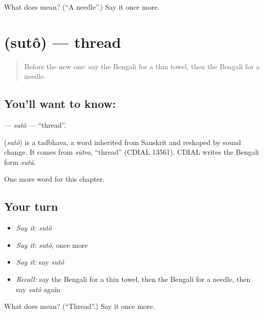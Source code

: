 \begin{tcolorbox}[breakable,colback=teal!4,colframe=teal!35!black,title={Before you move on}]
What does  mean? (\textquotedblleft{}A needle\textquotedblright{}.) Say it once more.
\end{tcolorbox}
\section[\texorpdfstring{\bn{সুতো} (sutô)}{সুতো (sutô)}]{ (sutô) — thread}

\label{lesson:BN-C109-suto}



\begin{quote}
Before the new one: say the Bengali for a thin towel, then the Bengali for a needle.
\end{quote}

\subsection*{You'll want to know: }
\textbf{} — \emph{sutô} — \textquotedblleft{}thread\textquotedblright{}.

\begin{cousinweb}
\textbf{} (\emph{sutô}) is a tadbhava, a word inherited from Sanskrit and reshaped by sound change. It comes from \emph{sūtra}, \textquotedblleft{}thread\textquotedblright{} (CDIAL 13561). CDIAL writes the Bengali form \emph{sutā}.
\end{cousinweb}

\begin{grammarlens}[title={What you've built}]
One more word for this chapter.
\end{grammarlens}

\subsection*{Your turn}
\begin{itemize}
\raggedright
  \item \emph{Say it:} \emph{sutô}
  \item \emph{Say it:} \emph{sutô}, once more
  \item \emph{Say it:} say \emph{sutô}
  \item \emph{Recall:} say the Bengali for a thin towel, then the Bengali for a needle, then say \emph{sutô} again
\end{itemize}

\begin{tcolorbox}[breakable,colback=teal!4,colframe=teal!35!black,title={Before you move on}]
What does  mean? (\textquotedblleft{}Thread\textquotedblright{}.) Say it once more.
\end{tcolorbox}
